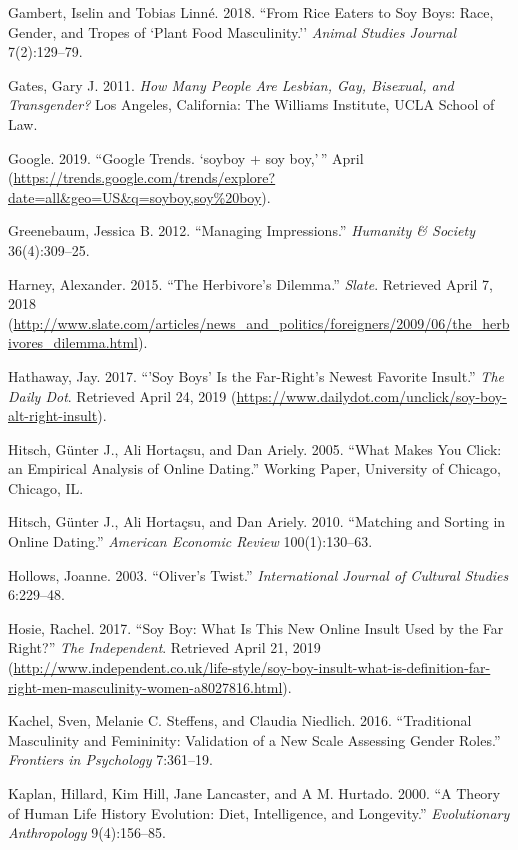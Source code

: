 \documentclass[twoside]{report}
\begin{document}
\hypertarget{gambert}{Gambert, Iselin and Tobias Linné. 2018. ``From Rice Eaters to Soy Boys: Race, Gender, and Tropes of `Plant Food Masculinity.'' \emph{Animal Studies Journal} 7(2):129--79.}

\hypertarget{gates}{Gates, Gary J. 2011. \emph{How Many People Are Lesbian, Gay, Bisexual, and Transgender?} Los Angeles, California: The Williams Institute, UCLA School of Law.}

\hypertarget{google}{Google. 2019. ``Google Trends. `soyboy + soy boy,'\,'' April (\url{https://trends.google.com/trends/explore?date=all\&geo=US\&q=soyboy,soy\%20boy}).}

\hypertarget{greenebaum}{Greenebaum, Jessica B. 2012. ``Managing Impressions.'' \emph{Humanity \& Society} 36(4):309--25.}

\hypertarget{harney}{Harney, Alexander. 2015. ``The Herbivore's Dilemma.'' \emph{Slate}. Retrieved April 7, 2018 (\url{http://www.slate.com/articles/news_and_politics/foreigners/2009/06/the_herbivores_dilemma.html}).}

\hypertarget{hathaway}{Hathaway, Jay. 2017. ``'Soy Boys' Is the Far-Right's Newest Favorite Insult.'' \emph{The Daily Dot}. Retrieved April 24, 2019 (\url{https://www.dailydot.com/unclick/soy-boy-alt-right-insult}).}

\hypertarget{hitsch1}{Hitsch, Günter J., Ali Hortaçsu, and Dan Ariely. 2005. ``What Makes You Click: an Empirical Analysis of Online Dating.'' Working Paper, University of Chicago, Chicago, IL.}

\hypertarget{hitsch2}{Hitsch, Günter J., Ali Hortaçsu, and Dan Ariely. 2010. ``Matching and Sorting in Online Dating.'' \emph{American Economic Review} 100(1):130--63.}

\hypertarget{hollows}{Hollows, Joanne. 2003. ``Oliver's Twist.'' \emph{International Journal of Cultural Studies} 6:229--48.}

\hypertarget{hosie}{Hosie, Rachel. 2017. ``Soy Boy: What Is This New Online Insult Used by the Far Right?'' \emph{The Independent}. Retrieved April 21, 2019 (\url{http://www.independent.co.uk/life-style/soy-boy-insult-what-is-definition-far-right-men-masculinity-women-a8027816.html}).}

\hypertarget{kachel}{Kachel, Sven, Melanie C. Steffens, and Claudia Niedlich. 2016. ``Traditional Masculinity and Femininity: Validation of a New Scale Assessing Gender Roles.'' \emph{Frontiers in Psychology} 7:361--19.}

\hypertarget{kaplan}{Kaplan, Hillard, Kim Hill, Jane Lancaster, and A M. Hurtado. 2000. ``A Theory of Human Life History Evolution: Diet, Intelligence, and Longevity.'' \emph{Evolutionary Anthropology} 9(4):156--85.}
\end{document}
